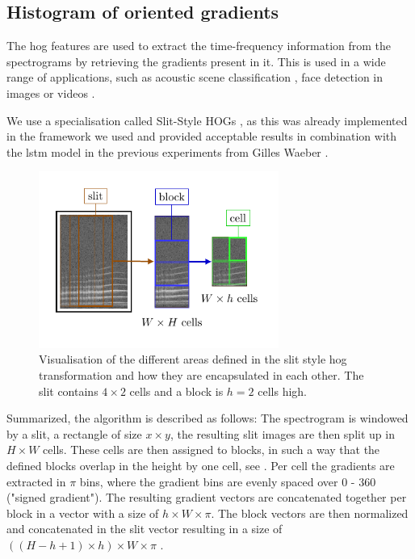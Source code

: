 \subsection{Histogram of oriented gradients}\label{hog}
The \gls{hog} features are used to extract the time-frequency information from the spectrograms by retrieving the gradients present in it. This is used in a wide range of applications, such as acoustic scene classification \cite{Rakotomamonjy2015,Yang2017}, face detection in images \cite{Sun2014, Dalal2005} or videos \cite{Surasak2018}.

We use a specialisation called Slit-Style HOGs \cite{Terasawa2009}, as this was already implemented in the framework we used and provided acceptable results in combination with the \gls{lstm} model in the previous experiments from Gilles Waeber \cite{Waeber2019BirdLearning}.

\begin{figure}[H]
\centering
  \includegraphics[width=0.7\textwidth]{image/slit_style_hog.pdf}
  \caption{Visualisation of the different areas defined in the slit style \gls{hog} transformation and how they are encapsulated in each other. The slit contains $4\times2$ cells and a block is $h=2$ cells high.}
  \label{fig:slit_style_hog}
\end{figure}

Summarized, the algorithm is described as follows: The spectrogram is windowed by a slit, a rectangle of size $x\times y$, the resulting slit images are then split up in $H\times W$ cells. These cells are then assigned to blocks, in such a way that the defined blocks overlap in the height by one cell, see . Per cell the gradients are extracted in $\pi$ bins, where the gradient bins are evenly spaced over 0 - 360 ("signed gradient"). The resulting gradient vectors are concatenated together per block in a vector with a size of $h\times W\times\pi$. The block vectors are then normalized and concatenated in the slit vector resulting in a size of $((H - h + 1)\times h)\times W\times\pi$ \cite{Terasawa2009}.

